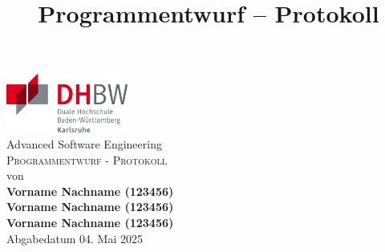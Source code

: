 \documentclass{article}
\title{Programmentwurf – Protokoll}
\begin{document}
\begin{titlepage}
\begin{center}
\vspace*{-2cm}
\hfill\includegraphics[width=4cm]{dhbw-logo.png}\\[2cm]
{\Huge Advanced Software Engineering}\\[1cm]
{\Huge\scshape Programmentwurf - Protokoll}\\[1cm]
{\large von}\\[0.5cm]
{\large\bfseries Vorname Nachname (123456)}\\[0.5cm]
{\large\bfseries Vorname Nachname (123456)}\\[0.5cm]
{\large\bfseries Vorname Nachname (123456)}\\[1.5cm]

{\large Abgabedatum 04. Mai 2025}
\vfill
\end{center}
\end{titlepage}

\newcommand{\task}[1]{\textit{\textcolor{sickblue}{[#1]}\newline\newline}}

{
  \hypersetup{linkcolor=black}
  \tableofcontents
}








\end{document}
